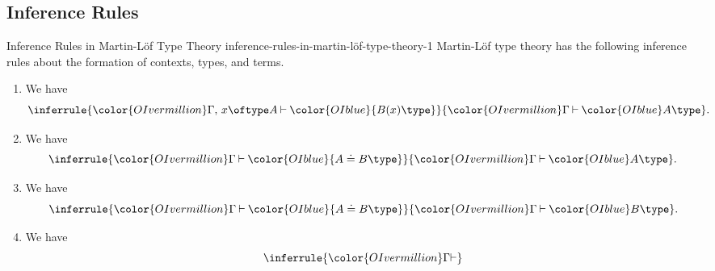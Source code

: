 \subsection{Inference Rules}\label{subsection-martin-löf-type-theory-inference-rules}
\begin{definition}{Inference Rules in Martin-Löf Type Theory \rmI}{inference-rules-in-martin-löf-type-theory-1}%
    Martin-Löf type theory has the following inference rules about the formation of contexts, types, and terms.
    \begin{enumerate}
        \item\label{inference-rules-in-martin-löf-type-theory-1-formation-of-dependent-types}We have
            \[
                \inferrule{%
                    {\color{OIvermillion}\Gamma,\,x\oftype A}%
                    \mathbin{\vdash}%
                    {\color{OIblue}{B(x)\type}}%
                }{%
                    {\color{OIvermillion}\Gamma}%
                    \mathbin{\vdash}%
                    {\color{OIblue}A\type}%
                }.%
            \]%
        \item\label{inference-rules-in-martin-löf-type-theory-1-formation-of-judgemental-equality-of-types-1}We have
            \[
                \inferrule{%
                    {\color{OIvermillion}\Gamma}%
                    \mathbin{\vdash}%
                    {\color{OIblue}{A\doteq B\type}}%
                }{%
                    {\color{OIvermillion}\Gamma}%
                    \mathbin{\vdash}%
                    {\color{OIblue}A\type}%
                }.%
            \]%
        \item\label{inference-rules-in-martin-löf-type-theory-1-formation-of-judgemental-equality-of-types-1}We have
            \[
                \inferrule{%
                    {\color{OIvermillion}\Gamma}%
                    \mathbin{\vdash}%
                    {\color{OIblue}{A\doteq B\type}}%
                }{%
                    {\color{OIvermillion}\Gamma}%
                    \mathbin{\vdash}%
                    {\color{OIblue}B\type}%
                }.%
            \]%
        \item\label{inference-rules-in-martin-löf-type-theory-1-formation-of-terms}We have
            \[
                \inferrule{%
                    {\color{OIvermillion}\Gamma}%
                    \mathbin{\vdash}%
}\]
\end{enumerate}
\end{definition}
